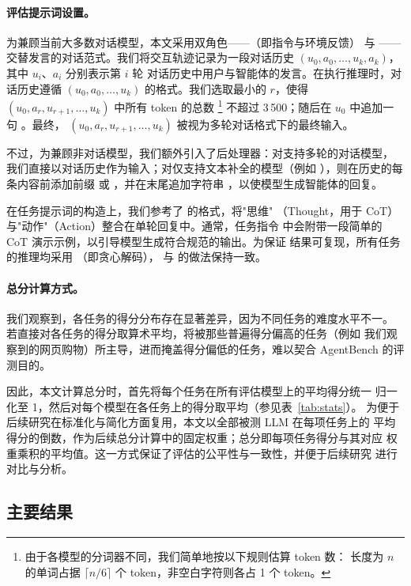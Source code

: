 \paragraph{评估提示词设置。}
为兼顾当前大多数对话模型，本文采用双角色——（即指令与环境反馈）
与 ——交替发言的对话范式。我们将交互轨迹记录为一段对话历史
$(u_0, a_0, \dots, u_k, a_k)$，其中 $u_i$、$a_i$ 分别表示第 $i$ 轮
对话历史中用户与智能体的发言。在执行推理时，对话历史遵循
$(u_0, a_0, \dots, u_k)$ 的格式。我们选取最小的 $r$，使得
$(u_0, a_r, u_{r+1}, \dots, u_k)$ 中所有 token 的总数
\footnote{由于各模型的分词器不同，我们简单地按以下规则估算 token 数：
长度为 $n$ 的单词占据 $\lceil n/6 \rceil$ 个 token，非空白字符则各占 1 个 token。}
不超过 3\,500；随后在 $u_0$ 中追加一句
。最终，
$(u_0, a_r, u_{r+1}, \dots, u_k)$ 被视为多轮对话格式下的最终输入。

不过，为兼顾非对话模型，我们额外引入了后处理器：对支持多轮的对话模型，
我们直接以对话历史作为输入；对仅支持文本补全的模型（例如
），则在历史的每条内容前添加前缀
 或 ，并在末尾追加字符串
，以使模型生成智能体的回复。

在任务提示词的构造上，我们参考了 \citet{yao2023b} 的格式，将"思维"
（Thought，用于 CoT）与"动作"（Action）整合在单轮回复中。通常，任务指令
中会附带一段简单的 CoT 演示示例，以引导模型生成符合规范的输出。为保证
结果可复现，所有任务的推理均采用 （即贪心解码），
与 \citet{wei2022b} 的做法保持一致。

\paragraph{总分计算方式。}
我们观察到，各任务的得分分布存在显著差异，因为不同任务的难度水平不一。
若直接对各任务的得分取算术平均，将被那些普遍得分偏高的任务（例如
我们观察到的网页购物）所主导，进而掩盖得分偏低的任务，难以契合
AgentBench 的评测目的。

因此，本文计算总分时，首先将每个任务在所有评估模型上的平均得分统一
归一化至 1，然后对每个模型在各任务上的得分取平均（参见表~\ref{tab:stats}）。
为便于后续研究在标准化与简化方面复用，本文以全部被测 LLM 在每项任务上的
平均得分的倒数，作为后续总分计算中的固定权重；总分即每项任务得分与其对应
权重乘积的平均值。这一方式保证了评估的公平性与一致性，并便于后续研究
进行对比与分析。

\subsection{主要结果}

